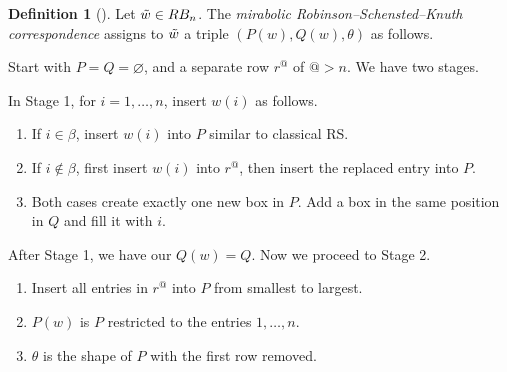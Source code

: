 \documentclass[12pt,a4paper]{article}
\theoremstyle{plain}
\theoremstyle{definition}
\newtheorem{definition}[thm]{Definition}
\theoremstyle{remark}
\begin{document}
    \begin{definition}[{\cite[Section 3.5]{travkin2009mirabolic}}]
        Let $\Tilde{w}\in RB_n$. The
        \textit{mirabolic Robinson--Schensted--Knuth correspondence} assigns to $\Tilde{w}$ a triple $(P(w),Q(w),\theta)$ as follows.
        
        Start with $P=Q=\varnothing$, and a separate row $r^@$ of $@ > n$. We have two stages.

        In Stage 1, for $i=1,\ldots,n$, insert $w(i)$ as follows.
        
        \begin{enumerate}
            \item If $i\in \beta$, insert $w(i)$ into $P$ similar to classical RS.
            \item If $i\notin \beta$, first insert $w(i)$ into $r^@$, then insert the replaced entry into $P$.
            \item Both cases create exactly one new box in $P$. Add a box in the same position in $Q$ and fill it with $i$.
        \end{enumerate}

        After Stage 1, we have our $Q(w) = Q$. Now we proceed to Stage 2.
        
        \begin{enumerate}
            \item[4.] Insert all entries in $r^@$ into $P$ from smallest to largest.
            \item[5.] $P(w)$ is $P$ restricted to the entries $1,\ldots,n$.
            \item[6.] $\theta$ is the shape of $P$ with the first row removed.
        \end{enumerate}
    \end{definition}
\end{document}
